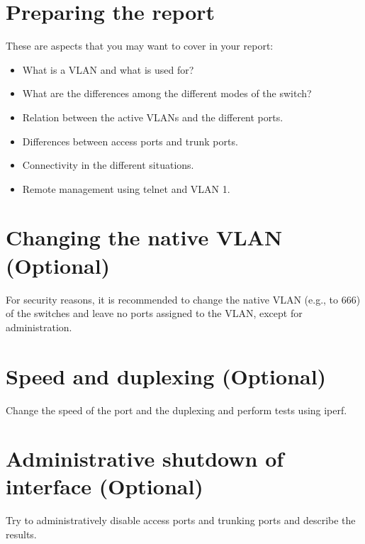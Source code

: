\section{Preparing the report}

These are aspects that you may want to cover in your report:
\begin{itemize}
\item What is a VLAN and what is used for?
\item What are the differences among the different modes of the switch?
\item Relation between the active VLANs and the different ports.
\item Differences between access ports and trunk ports.
\item Connectivity in the different situations.
\item Remote management using telnet and VLAN 1.
\end{itemize}


\section{Changing the native VLAN (Optional)}

For security reasons, it is recommended to change the native VLAN (e.g., to 666) of the switches and leave no ports assigned to the VLAN, except for administration.

\section{Speed and duplexing (Optional)}

Change the speed of the port and the duplexing and perform tests using iperf.

\section{Administrative shutdown of interface (Optional)}

Try to administratively disable access ports and trunking ports and describe the results.










